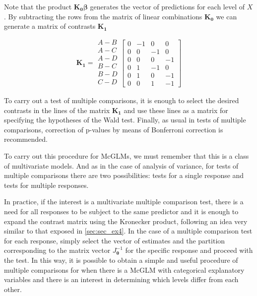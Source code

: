 \documentclass[AMA,STIX1COL]{WileyNJD-v2}
\begin{document}
Note that the product $\boldsymbol{K_0} \boldsymbol{\beta}$ generates the vector of predictions for each level of $X$. By subtracting the rows from the matrix of linear combinations $\boldsymbol{K_0}$ we can generate a matrix of contrasts $\boldsymbol{K_1}$

$$
    \boldsymbol{K_1} = 
      \begin{matrix}
        A-B\\ 
        A-C\\ 
        A-D\\ 
        B-C\\
        B-D\\
        C-D\\ 
      \end{matrix} 
    \begin{bmatrix}
      0 & -1 &  0 &  0\\ 
      0 &  0 & -1 &  0\\ 
      0 &  0 &  0 & -1\\ 
      0 &  1 & -1 &  0\\ 
      0 &  1 &  0 & -1\\ 
      0 &  0 &  1 & -1 
    \end{bmatrix}
$$

To carry out a test of multiple comparisons, it is enough to select the desired contrasts in the lines of the matrix $\boldsymbol{K_1}$ and use these lines as a matrix for specifying the hypotheses of the Wald test. Finally, as usual in tests of multiple comparisons, correction of p-values by means of Bonferroni correction is recommended.

To carry out this procedure for McGLMs, we must remember that this is a class of multivariate models. And as in the case of analysis of variance, for tests of multiple comparisons there are two possibilities: tests for a single response and tests for multiple responses. 

In practice, if the interest is a multivariate multiple comparison test, there is a need for all responses to be subject to the same predictor and it is enough to expand the contrast matrix using the Kronecker product, following an idea very similar to that exposed in \autoref{sec:sec_ex4}. In the case of a multiple comparison test for each response, simply select the vector of estimates and the partition corresponding to the matrix vector $J_{\boldsymbol{\theta}}^{-1}$ for the specific response and proceed with the test. In this way, it is possible to obtain a simple and useful procedure of multiple comparisons for when there is a McGLM with categorical explanatory variables and there is an interest in determining which levels differ from each other.
\end{document}
